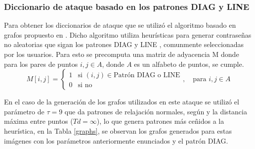 \subsubsection{Diccionario de ataque basado en los patrones DIAG y LINE}
Para obtener los diccionarios de ataque que se utiliz\'o el algoritmo basado en grafos propuesto en \cite{van2010purely}. Dicho algoritmo utiliza heur\'isticas para generar contrase\~nas no aleatorias que sigan los patrones DIAG y LINE \cite{s22051987},  comunmente seleccionadas por los usuarios. Para esto se precomputa una matriz de adyacencia M donde para los pares de puntos $i,j \in A$, donde $A$ es un alfabeto de puntos, se cumple.
\[
 M[i,j] = 
\begin{cases} 
	1 & \text{si } (i, j) \in \text{Patrón DIAG o LINE} \\
	0 & \text{si no}
\end{cases}
, \quad \text{para } i,j \in A
\] 

En el caso de la generaci\'on de los grafos utilizados en este ataque se utiliz\'o el par\'ametro de $\tau=9$ que da patrones de relajaci\'on normales, seg\'un \cite{van2010purely} y la distancia m\'axima entre puntos ($Td = \infty$), lo que genera patrones m\'as ce\~nidos a la heur\'istica, en la Tabla \ref{graphs},  se observan los grafos generados para estas im\'agenes con los par\'ametros anteriormente enunciados y el patr\'on DIAG.



